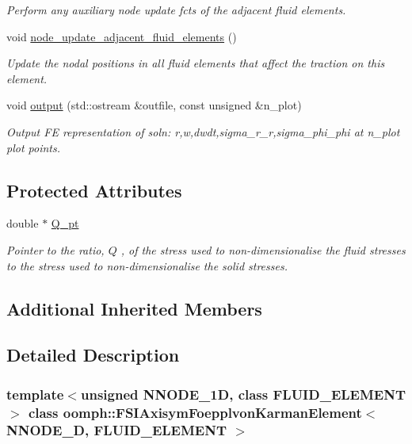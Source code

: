\begin{DoxyCompactItemize}
\begin{DoxyCompactList}\small\item\em Perform any auxiliary node update fcts of the adjacent fluid elements. \end{DoxyCompactList}\item 
void \hyperlink{classoomph_1_1FSIAxisymFoepplvonKarmanElement_a21466ab3a24ac1f97af078a559a5679b}{node\+\_\+update\+\_\+adjacent\+\_\+fluid\+\_\+elements} ()
\begin{DoxyCompactList}\small\item\em Update the nodal positions in all fluid elements that affect the traction on this element. \end{DoxyCompactList}\item 
void \hyperlink{classoomph_1_1FSIAxisymFoepplvonKarmanElement_a03c82e935db8c1c93dfe2f443ec5e817}{output} (std\+::ostream \&outfile, const unsigned \&n\+\_\+plot)
\begin{DoxyCompactList}\small\item\em Output FE representation of soln\+: r,w,dwdt,sigma\+\_\+r\+\_\+r,sigma\+\_\+phi\+\_\+phi at n\+\_\+plot plot points. \end{DoxyCompactList}\end{DoxyCompactItemize}
\subsection*{Protected Attributes}
\begin{DoxyCompactItemize}
\item 
double $\ast$ \hyperlink{classoomph_1_1FSIAxisymFoepplvonKarmanElement_a5a46530d8ee9c6d2a478818e90c4a65e}{Q\+\_\+pt}
\begin{DoxyCompactList}\small\item\em Pointer to the ratio, $ Q $ , of the stress used to non-\/dimensionalise the fluid stresses to the stress used to non-\/dimensionalise the solid stresses. \end{DoxyCompactList}\end{DoxyCompactItemize}
\subsection*{Additional Inherited Members}


\subsection{Detailed Description}
\subsubsection*{template$<$unsigned N\+N\+O\+D\+E\+\_\+1D, class F\+L\+U\+I\+D\+\_\+\+E\+L\+E\+M\+E\+NT$>$\newline
class oomph\+::\+F\+S\+I\+Axisym\+Foepplvon\+Karman\+Element$<$ N\+N\+O\+D\+E\+\_\+D, F\+L\+U\+I\+D\+\_\+\+E\+L\+E\+M\+E\+N\+T $>$}

